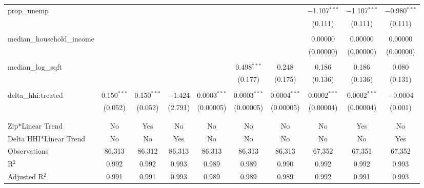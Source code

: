 \begin{table}[H]
{\begin{tabular}{@{\extracolsep{5pt}}lccccccccc}
  prop\_unemp &  &  &  &  &  &  & $-$1.107$^{***}$ & $-$1.107$^{***}$ & $-$0.980$^{***}$ \\  

   &  &  &  &  &  &  & (0.111) & (0.111) & (0.111) \\  

   & & & & & & & & & \\  

  median\_household\_income &  &  &  &  &  &  & 0.00000 & 0.00000 & 0.00000 \\  

   &  &  &  &  &  &  & (0.00000) & (0.00000) & (0.00000) \\  

   & & & & & & & & & \\  

  median\_log\_sqft &  &  &  &  & 0.498$^{***}$ & 0.248 & 0.186 & 0.186 & 0.080 \\  

   &  &  &  &  & (0.177) & (0.175) & (0.136) & (0.136) & (0.131) \\  

   & & & & & & & & & \\  

  delta\_hhi:treated & 0.150$^{***}$ & 0.150$^{***}$ & $-$1.424 & 0.0003$^{***}$ & 0.0003$^{***}$ & 0.0004$^{***}$ & 0.0002$^{***}$ & 0.0002$^{***}$ & $-$0.0004 \\  

   & (0.052) & (0.052) & (2.791) & (0.00005) & (0.00005) & (0.00005) & (0.00004) & (0.00004) & (0.001) \\  

   & & & & & & & & & \\  

 \hline \\[-1.8ex]  

 Zip*Linear Trend & No & Yes & No & No & No & No & No & Yes & No \\  

 Delta HHI*Linear Trend & No & No & Yes & No & No & No & No & No & Yes \\  

 Observations & 86,313 & 86,312 & 86,313 & 86,313 & 86,313 & 86,313 & 67,352 & 67,351 & 67,352 \\  

 R$^{2}$ & 0.992 & 0.992 & 0.993 & 0.989 & 0.989 & 0.990 & 0.992 & 0.992 & 0.993 \\  

 Adjusted R$^{2}$ & 0.991 & 0.991 & 0.993 & 0.989 & 0.989 & 0.989 & 0.992 & 0.991 & 0.993 \\  


\end{tabular}}
\end{table}
